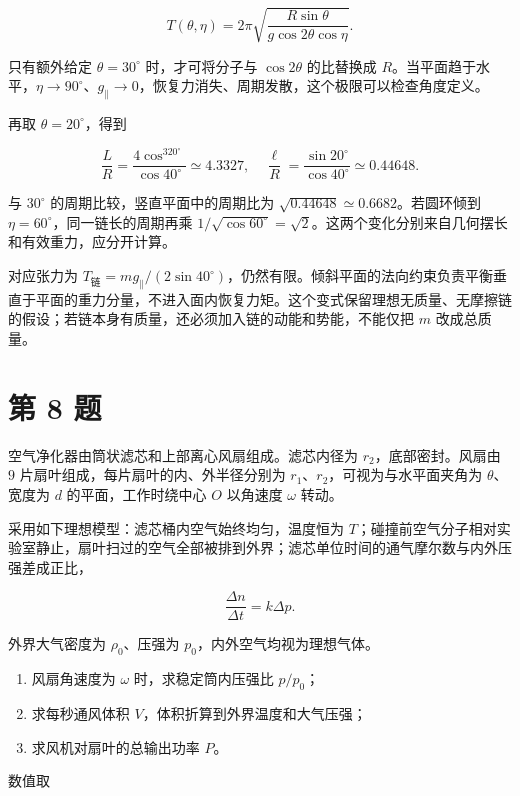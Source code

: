 \documentclass[12pt,a4paper,UTF8]{ctexart}
\newcommand{\tightlist}{\setlength{\itemsep}{0pt}\setlength{\parskip}{0pt}}
\begin{document}
\[T(\theta,\eta)=2\pi\sqrt{\frac{R\sin\theta}{g\cos2\theta\cos\eta}}.\]

只有额外给定 \(\theta=30^\circ\) 时，才可将分子与 \(\cos2\theta\)
的比替换成
\(R\)。当平面趋于水平，\(\eta\to90^\circ\)、\(g_\parallel\to0\)，恢复力消失、周期发散，这个极限可以检查角度定义。

再取 \(\theta=20^\circ\)，得到

\[\frac LR=\frac{4\cos^320^\circ}{\cos40^\circ}\simeq4.3327,\quad \frac\ell R=\frac{\sin20^\circ}{\cos40^\circ}\simeq0.44648.\]

与 \(30^\circ\) 的周期比较，竖直平面中的周期比为
\(\sqrt{0.44648}\simeq0.6682\)。若圆环倾到
\(\eta=60^\circ\)，同一链长的周期再乘
\(1/\sqrt{\cos60^\circ}=\sqrt2\)。这两个变化分别来自几何摆长和有效重力，应分开计算。

对应张力为
\(T_{\text{链}}=mg_\parallel/(2\sin40^\circ)\)，仍然有限。倾斜平面的法向约束负责平衡垂直于平面的重力分量，不进入面内恢复力矩。这个变式保留理想无质量、无摩擦链的假设；若链本身有质量，还必须加入链的动能和势能，不能仅把
\(m\) 改成总质量。

\newpage

\section{第 8 题}\label{ux7b2c-8-ux9898}

空气净化器由筒状滤芯和上部离心风扇组成。滤芯内径为
\(r_2\)，底部密封。风扇由 \(9\) 片扇叶组成，每片扇叶的内、外半径分别为
\(r_1\)、\(r_2\)，可视为与水平面夹角为 \(\theta\)、宽度为 \(d\)
的平面，工作时绕中心 \(O\) 以角速度 \(\omega\) 转动。

采用如下理想模型：滤芯桶内空气始终均匀，温度恒为
\(T\)；碰撞前空气分子相对实验室静止，扇叶扫过的空气全部被排到外界；滤芯单位时间的通气摩尔数与内外压强差成正比，

\[
\frac{\Delta n}{\Delta t}=k\Delta p.
\]

外界大气密度为 \(\rho_0\)、压强为 \(p_0\)，内外空气均视为理想气体。

\begin{enumerate}
\def\labelenumi{\arabic{enumi}.}
\tightlist
\item
  风扇角速度为 \(\omega\) 时，求稳定筒内压强比 \(p/p_0\)；
\item
  求每秒通风体积 \(V\)，体积折算到外界温度和大气压强；
\item
  求风机对扇叶的总输出功率 \(P\)。
\end{enumerate}

数值取
\end{document}
